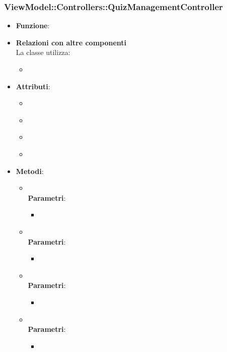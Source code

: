 \subsubsection{ViewModel::Controllers::QuizManagementController}
\begin{itemize}
\item\textbf{Funzione}:
\item\textbf{Relazioni con altre componenti}\\
La classe utilizza:
	\begin{itemize}
		\item
	\end{itemize}
\item\textbf{Attributi}:
	\begin{itemize}
		\item\code{}\\
		\item\code{}\\
		\item\code{}\\
		\item\code{}\\
	\end{itemize}
\item\textbf{Metodi}:
	\begin{itemize}
		\item\code{}\\
		\textbf{Parametri}:
			\begin{itemize}
				\item\code{}\\
			\end{itemize}
		\item\code{}\\
		\textbf{Parametri}:
			\begin{itemize}
				\item\code{}\\
			\end{itemize}
		\item\code{}\\
		\textbf{Parametri}:
			\begin{itemize}
				\item\code{}\\
			\end{itemize}
		\item\code{}\\
		\textbf{Parametri}:
			\begin{itemize}
				\item\code{}\\
			\end{itemize}
	\end{itemize}
\end{itemize}


